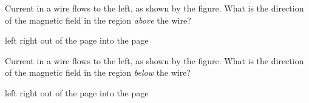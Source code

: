 \documentclass{exam}
\begin{document}
\begin{questions}



\question Current in a wire flows to the left, as shown by the figure. What is the direction of the magnetic field in the region \textit{above} the wire?

\begin{center}
\end{center}

\begin{randomizechoices}
\choice left
\choice right
\choice out of the page %
\CorrectChoice into the page %
\end{randomizechoices}

\question Current in a wire flows to the left, as shown by the figure. What is the direction of the magnetic field in the region \textit{below} the wire?

\begin{center}
\end{center}

\begin{randomizechoices}
\choice left
\choice right
\CorrectChoice out of the page %
\choice into the page %
\end{randomizechoices}

\clearpage


\end{questions}
\end{document}
